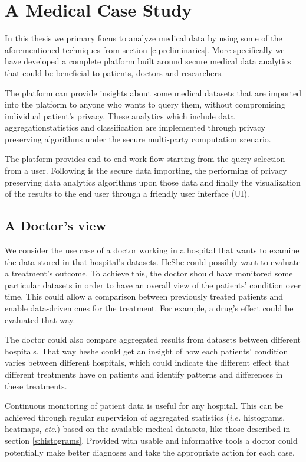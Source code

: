 \chapter{A Medical Case Study}\label{c:medical-study}

In this thesis we primary focus to analyze medical data by using some of the aforementioned techniques from section \ref{c:preliminaries}.
More specifically we have developed a complete platform built around secure medical data analytics that could be beneficial to patients, doctors and researchers.

The platform can provide insights about some medical datasets that are imported into the platform to anyone who wants to query them, without compromising individual patient's privacy.
These analytics which include data aggregation\myslash statistics and classification are implemented through privacy preserving algorithms under the secure multi-party computation scenario.

The platform provides end to end work flow starting from the query selection from a user.
Following is the secure data importing, the performing of privacy preserving data analytics algorithms upon those data and finally the visualization of the results to the end user through a friendly user interface (UI).

\section{A Doctor's view}
We consider the use case of a doctor working in a hospital that wants to examine the data stored in that hospital's datasets.
He\myslash She could possibly want to evaluate a treatment's outcome.
To achieve this, the doctor should have monitored some particular datasets in order to have an overall view of the patients' condition over time.
This could allow a comparison between previously treated patients and enable data-driven cues for the treatment.
For example, a drug's effect could be evaluated that way.

The doctor could also compare aggregated results from datasets between different hospitals.
That way he\myslash she could get an insight of how each patients' condition varies between different hospitals, which could indicate the different effect that different treatments have on patients and identify patterns
and differences in these treatments.

Continuous monitoring of patient data is useful for any hospital.
This can be achieved through regular supervision of aggregated statistics (\textit{i.e.} histograms, heatmaps, \textit{etc}.) based on the available medical datasets, like those described in section \ref{s:histograms}.
Provided with usable and informative tools a doctor could potentially make better diagnoses and take the appropriate action for each case.


